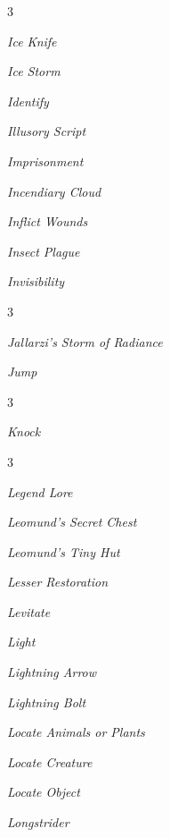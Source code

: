 \documentclass[10pt,a4paper,twoside,bg=print,twocolumn,openany,nodeprecatedcode]{dndbook}
\begin{document}
\begin{description}
\begin{multicols}{3}
\item \textit{Ice Knife}
\item \textit{Ice Storm}
\item \textit{Identify}
\item \textit{Illusory Script}
\item \textit{Imprisonment}
\item \textit{Incendiary Cloud}
\item \textit{Inflict Wounds}
\item \textit{Insect Plague}
\item \textit{Invisibility}
\end{multicols}

\end{description}


\begin{description}
\begin{multicols}{3}
\item \textit{Jallarzi's Storm of Radiance}
\item \textit{Jump}
\end{multicols}

\end{description}


\begin{description}
\begin{multicols}{3}
\item \textit{Knock}
\end{multicols}

\end{description}


\begin{description}
\begin{multicols}{3}
\item \textit{Legend Lore}
\item \textit{Leomund's Secret Chest}
\item \textit{Leomund's Tiny Hut}
\item \textit{Lesser Restoration}
\item \textit{Levitate}
\item \textit{Light}
\item \textit{Lightning Arrow}
\item \textit{Lightning Bolt}
\item \textit{Locate Animals or Plants}
\item \textit{Locate Creature}
\item \textit{Locate Object}
\item \textit{Longstrider}
\end{multicols}

\end{description}
\end{document}
